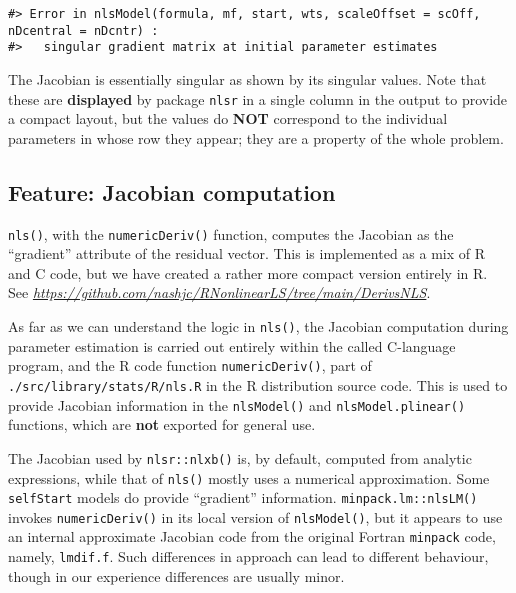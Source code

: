 \begin{verbatim}
#> Error in nlsModel(formula, mf, start, wts, scaleOffset = scOff, nDcentral = nDcntr) : 
#>   singular gradient matrix at initial parameter estimates
\end{verbatim}

The Jacobian is essentially singular as shown by its singular
values. Note that these are \textbf{displayed} by package \texttt{nlsr} in a single column in
the output to provide a compact layout, but the values do \textbf{NOT} correspond to
the individual parameters in
whose row they appear; they are a property of the whole problem.

\hypertarget{feature-jacobian-computation}{%
\subsection{Feature: Jacobian computation}\label{feature-jacobian-computation}}

\texttt{nls()}, with the \texttt{numericDeriv()} function, computes the Jacobian as the ``gradient''
attribute of the residual vector. This is implemented as a mix of R and C code, but
we have created a rather more compact version entirely in R.
See \emph{\url{https://github.com/nashjc/RNonlinearLS/tree/main/DerivsNLS}}.

As far as we can understand the logic in \texttt{nls()}, the Jacobian computation during
parameter estimation is carried out entirely within the called C-language program,
and the R code function \texttt{numericDeriv()}, part of \texttt{./src/library/stats/R/nls.R}
in the R distribution source code. This is used to provide Jacobian information in
the \texttt{nlsModel()} and \texttt{nlsModel.plinear()} functions, which are \textbf{not} exported for
general use.

The Jacobian used by \texttt{nlsr::nlxb()} is, by default, computed from analytic
expressions, while that of \texttt{nls()} mostly uses a numerical approximation. Some
\texttt{selfStart} models do provide ``gradient'' information. \texttt{minpack.lm::nlsLM()}
invokes \texttt{numericDeriv()} in its local version of \texttt{nlsModel()}, but it appears
to use an internal approximate Jacobian code from the original Fortran
\texttt{minpack} code, namely, \texttt{lmdif.f}. Such differences in approach can lead to
different behaviour, though in our experience differences are usually minor.


